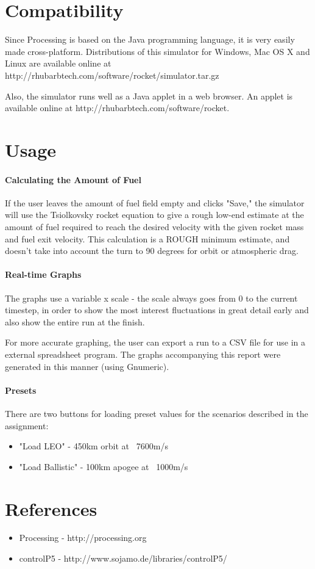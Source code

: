 \documentclass[10pt]{article}
\begin{document}
\section{Compatibility}
Since Processing is based on the Java programming language, it is very easily
made cross-platform. Distributions of this simulator for Windows, Mac OS X
and Linux are available online at
http://rhubarbtech.com/software/rocket/simulator.tar.gz

Also, the simulator runs well as a Java applet in a web browser. An applet is
available online at http://rhubarbtech.com/software/rocket. 

\section{Usage}
\paragraph{Calculating the Amount of Fuel}
If the user leaves the amount of fuel field empty and clicks "Save,"
the simulator will use the Tsiolkovsky rocket equation to give a rough
low-end estimate at the amount of fuel required to reach the desired velocity
with the given rocket mass and fuel exit velocity. This calculation is a 
ROUGH minimum estimate, and doesn't take into account the turn to 90 degrees
for orbit or atmospheric drag.

\paragraph{Real-time Graphs}
The graphs use a variable x scale - the scale always goes from 0 to the
current timestep, in order to show the most interest fluctuations in 
great detail early and also show the entire run at the finish.

For more accurate graphing, the user can export a run to a CSV file for
use in a external spreadsheet program. The graphs accompanying this report were
generated in this manner (using Gnumeric).

\paragraph{Presets}
There are two buttons for loading preset values for the scenarios described
in the assignment:
\begin{itemize}
    \item "Load LEO" - 450km orbit at ~7600m/s
    \item "Load Ballistic" - 100km apogee at ~1000m/s
\end{itemize}

\section{References}
\begin{itemize}
	\item Processing - http://processing.org
        \item controlP5 - http://www.sojamo.de/libraries/controlP5/
\end{itemize}
\end{document}
